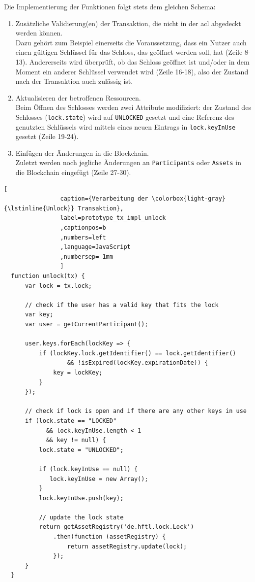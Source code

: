             Die Implementierung der Funktionen folgt stets dem gleichen Schema:
            \begin{enumerate}
                \item Zusätzliche Validierung(en) der Transaktion, die nicht in der \gls{acl} abgedeckt werden können.\smallskip\\
                    Dazu gehört zum Beispiel einerseits die Voraussetzung, dass ein Nutzer auch einen gültigen Schlüssel für das Schloss, das geöffnet werden soll, hat (Zeile 8-13). 
                    Andererseits wird überprüft, ob das Schloss geöffnet ist und/oder in dem Moment ein anderer Schlüssel verwendet wird (Zeile 16-18), also der Zustand nach der Transaktion auch zulässig ist.
                \item Aktualisieren der betroffenen Ressourcen.\smallskip\\
                    Beim Öffnen des Schlosses werden zwei Attribute modifiziert: der Zustand des Schlosses (\colorbox{light-gray}{\lstinline{lock.state}}) wird auf \colorbox{light-gray}{\lstinline{UNLOCKED}} gesetzt und eine Referenz des genutzten Schlüssels wird mittels eines neuen Eintrags in \colorbox{light-gray}{\lstinline{lock.keyInUse}} gesetzt (Zeile 19-24).
                \item Einfügen der Änderungen in die Blockchain.\smallskip\\
                    Zuletzt werden noch jegliche Änderungen an \colorbox{light-gray}{\lstinline{Participants}} oder \colorbox{light-gray}{\lstinline{Assets}} in die Blockchain eingefügt (Zeile 27-30).
            \end{enumerate}
            \begin{lstlisting}[
                caption={Verarbeitung der \colorbox{light-gray}{\lstinline{Unlock}} Transaktion},
                label=prototype_tx_impl_unlock
                ,captionpos=b
                ,numbers=left
                ,language=JavaScript
                ,numbersep=-1mm
                ]
  function unlock(tx) {
      var lock = tx.lock;
 
      // check if the user has a valid key that fits the lock 
      var key;
      var user = getCurrentParticipant();

      user.keys.forEach(lockKey => {
          if (lockKey.lock.getIdentifier() == lock.getIdentifier()
                  && !isExpired(lockKey.expirationDate)) {
              key = lockKey;
          }
      });

      // check if lock is open and if there are any other keys in use
      if (lock.state == "LOCKED"
            && lock.keyInUse.length < 1
            && key != null) {
          lock.state = "UNLOCKED";
 
          if (lock.keyInUse == null) {
             lock.keyInUse = new Array();
          }
          lock.keyInUse.push(key);

          // update the lock state
          return getAssetRegistry('de.hftl.lock.Lock')
              .then(function (assetRegistry) {
                  return assetRegistry.update(lock);
              });
      }
  }
            \end{lstlisting}
            
